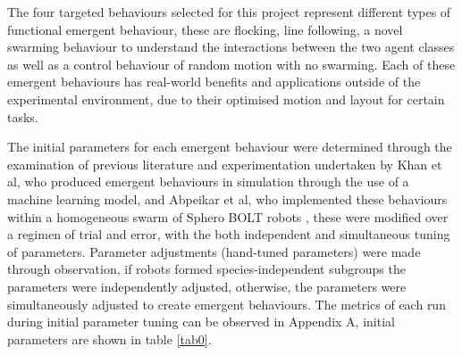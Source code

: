 \documentclass[conference]{IEEEtran}
\begin{document}
The four targeted behaviours selected for this project represent different types of functional emergent behaviour, these are flocking, line following, a novel swarming behaviour to understand the interactions between the two agent classes as well as a control behaviour of random motion with no swarming. Each of these emergent behaviours has real-world benefits and applications outside of the experimental environment, due to their optimised motion and layout for certain tasks. 

The initial parameters for each emergent behaviour were determined through the examination of previous literature and experimentation undertaken by Khan et al, who produced emergent behaviours in simulation through the use of a machine learning model, and Abpeikar et al, who implemented these behaviours within a homogeneous swarm of Sphero BOLT robots \cite{khan_autonomous_2020,abpeikar_iterative_2023}, these were modified over a regimen of trial and error, with the both independent and simultaneous tuning of parameters. Parameter adjustments (hand-tuned parameters) were made through observation, if robots formed species-independent subgroups the parameters were independently adjusted, otherwise, the parameters were simultaneously adjusted to create emergent behaviours. The metrics of each run during initial parameter tuning can be observed in Appendix A, initial parameters are shown in table \ref{tab0}.
\end{document}
